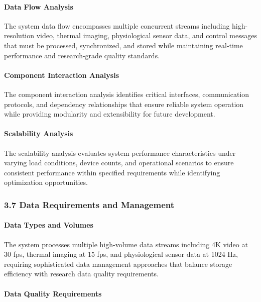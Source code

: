 \documentclass[12pt,a4paper]{report}
\begin{document}
\paragraph{Data Flow Analysis}

The system data flow encompasses multiple concurrent streams including high-resolution video, thermal imaging,
physiological sensor data, and control messages that must be processed, synchronized, and stored while maintaining
real-time performance and research-grade quality standards.

\paragraph{Component Interaction Analysis}

The component interaction analysis identifies critical interfaces, communication protocols, and dependency relationships
that ensure reliable system operation while providing modularity and extensibility for future development.

\paragraph{Scalability Analysis}

The scalability analysis evaluates system performance characteristics under varying load conditions, device counts, and
operational scenarios to ensure consistent performance within specified requirements while identifying optimization
opportunities.

\subsubsection{3.7 Data Requirements and Management}

\paragraph{Data Types and Volumes}

The system processes multiple high-volume data streams including 4K video at 30 fps, thermal imaging at 15 fps, and
physiological sensor data at 1024 Hz, requiring sophisticated data management approaches that balance storage efficiency
with research data quality requirements.

\paragraph{Data Quality Requirements}
\end{document}
